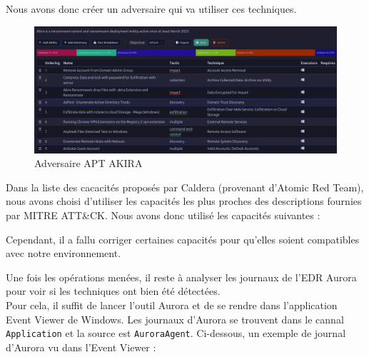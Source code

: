 \documentclass[12pt,letterpaper]{article}
\begin{document}
Nous avons donc créer un adversaire qui va utiliser ces techniques.

\begin{figure}[h!]
    \centering
    \includegraphics[width=1\textwidth]{images/caldera/akira_adversary.png}
    \caption{Adversaire APT AKIRA}
    \label{fig:akira_adversary}
\end{figure}

Dans la liste des cacacités proposés par Caldera (provenant d'Atomic Red Team), nous avons choisi d'utiliser les capacités les plus proches des descriptions fournies par MITRE ATT\&CK.
Nous avons donc utilisé les capacités suivantes :



Cependant, il a fallu corriger certaines capacités pour qu'elles soient compatibles avec notre environnement. 


Une fois les opérations menées, il reste à analyser les journaux de l'EDR Aurora pour voir si les techniques ont bien été détectées. \\
Pour cela, il suffit de lancer l'outil Aurora et de se rendre dans l'application Event Viewer de Windows.
Les journaux d'Aurora se trouvent dans le cannal \verb|Application| et la source est \verb|AuroraAgent|.
Ci-dessous, un exemple de journal d'Aurora vu dans l'Event Viewer :
\end{document}
